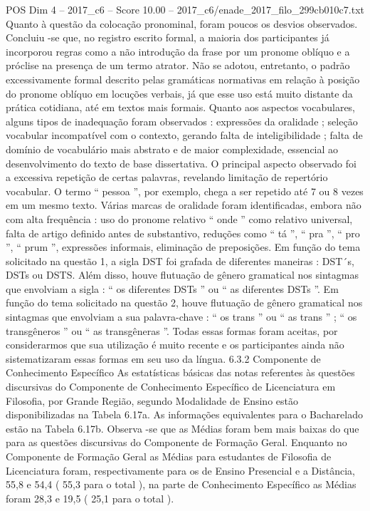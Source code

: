 \begin{textsample}{POS Dim 4 – 2017\_c6 – Score 10.00 – 2017\_c6/enade\_2017\_filo\_299cb010c7.txt}
Quanto à questão da colocação pronominal, foram poucos os desvios observados.
Concluiu -se que, no registro escrito formal, a maioria dos participantes já incorporou regras como a não introdução da frase por um pronome oblíquo e a próclise na presença de um termo atrator.
Não se adotou, entretanto, o padrão excessivamente formal descrito pelas gramáticas normativas em relação à posição do pronome oblíquo em locuções verbais, já que esse uso está muito distante da prática cotidiana, até em textos mais formais.
Quanto aos aspectos vocabulares, alguns tipos de inadequação foram observados : expressões da oralidade ; seleção vocabular incompatível com o contexto, gerando falta de inteligibilidade ; falta de domínio de vocabulário mais abstrato e de maior complexidade, essencial ao desenvolvimento do texto de base dissertativa.
O principal aspecto observado foi a excessiva repetição de certas palavras, revelando limitação de repertório vocabular.
O termo “ pessoa ”, por exemplo, chega a ser repetido até 7 ou 8 vezes em um mesmo texto.
Várias marcas de oralidade foram identificadas, embora não com alta frequência : uso do pronome relativo “ onde ” como relativo universal, falta de artigo definido antes de substantivo, reduções como “ tá ”, “ pra ”, “ pro ”, “ prum ”, expressões informais, eliminação de preposições.
Em função do tema solicitado na questão 1, a sigla DST foi grafada de diferentes maneiras : DST´s, DSTs ou DSTS.
Além disso, houve flutuação de gênero gramatical nos sintagmas que envolviam a sigla : “ os diferentes DSTs ” ou “ as diferentes DSTs ”.
Em função do tema solicitado na questão 2, houve flutuação de gênero gramatical nos sintagmas que envolviam a sua palavra-chave : “ os trans ” ou “ as trans ” ; “ os transgêneros ” ou “ as transgêneras ”.
Todas essas formas foram aceitas, por considerarmos que sua utilização é muito recente e os participantes ainda não sistematizaram essas formas em seu uso da língua. 6.3.2 Componente de Conhecimento Específico As estatísticas básicas das notas referentes às questões discursivas do Componente de Conhecimento Específico de Licenciatura em Filosofia, por Grande Região, segundo Modalidade de Ensino estão disponibilizadas na Tabela 6.17a.
As informações equivalentes para o Bacharelado estão na Tabela 6.17b.
Observa -se que as Médias foram bem mais baixas do que para as questões discursivas do Componente de Formação Geral.
Enquanto no Componente de Formação Geral as Médias para estudantes de Filosofia de Licenciatura foram, respectivamente para os de Ensino Presencial e a Distância, 55,8 e 54,4 ( 55,3 para o total ), na parte de Conhecimento Específico as Médias foram 28,3 e 19,5 ( 25,1 para o total ).

\end{textsample}
